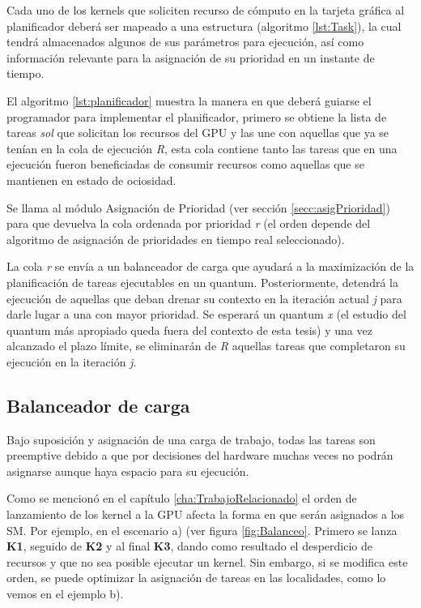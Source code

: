Cada uno de los kernels que soliciten recurso de cómputo en la tarjeta gráfica al planificador deberá ser mapeado a una estructura (algoritmo \ref{lst:Task}), la cual tendrá almacenados algunos de sus parámetros para ejecución, así como información relevante para la asignación de su prioridad en un instante de tiempo.
\newline

El algoritmo \ref{lst:planificador} muestra la manera en que deberá guiarse el programador para implementar el planificador, primero se obtiene la lista de tareas \textit{sol} que solicitan los recursos del GPU y las une con aquellas que ya se tenían en la cola de ejecución \textit{R}, esta cola contiene tanto las tareas que en una ejecución fueron beneficiadas de consumir recursos como aquellas que se mantienen en estado de ociosidad.

Se llama al módulo Asignación de Prioridad (ver sección \ref{secc:asigPrioridad}) para que devuelva la cola ordenada por prioridad \textit{r} (el orden depende del algoritmo de asignación de prioridades en tiempo real seleccionado).

La cola \textit{r} se envía a un balanceador de carga que ayudará a la maximización de la planificación de tareas ejecutables en un quantum. Posteriormente, detendrá la ejecución de aquellas que deban drenar su contexto en la iteración actual \textit{j} para darle lugar a una con mayor prioridad.
Se esperará un quantum \textit{x} (el estudio del quantum más apropiado queda fuera del contexto de esta tesis) y una vez alcanzado el plazo límite, se eliminarán de \textit{R} aquellas tareas que completaron su ejecución en la iteración \textit{j}. 



\subsection{Balanceador de carga} \label{secc:balanceador}

Bajo suposición y asignación de una carga de trabajo, todas las tareas son preemptive debido a que por decisiones del hardware muchas veces no podrán asignarse aunque haya espacio para su ejecución.
\newline

Como se mencionó en el capítulo \ref{cha:TrabajoRelacionado} el orden de lanzamiento de los kernel a la GPU afecta la forma en que serán asignados a los SM. Por ejemplo, en el escenario a) (ver figura \ref{fig:Balanceo}. Primero se lanza \textbf{K1}, seguido de \textbf{K2} y al final \textbf{K3}, dando como resultado el desperdicio de recursos y que no sea posible ejecutar un kernel. Sin embargo, si se modifica este orden, se puede optimizar la asignación de tareas en las localidades, como lo vemos en el ejemplo b).
\newline

